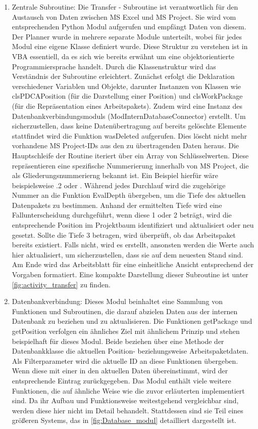 \documentclass[11pt,a4paper]{report}
\begin{document}
\begin{enumerate}
    \item Zentrale Subroutine: Die \glqq Transfer \grqq{}- Subroutine ist verantwortlich für den Austausch von Daten zwischen MS Excel und MS Project. Sie wird vom entsprechenden Python Modul aufgerufen und empfängt Daten von diesem. Der Planner wurde in mehrere separate Module unterteilt, wobei für jedes Modul eine eigene Klasse definiert wurde. Diese Struktur zu verstehen ist in VBA essentiell, da es sich wie bereits erwähnt um eine objektorientierte Programmiersprache handelt. Durch die Klassenstruktur wird das Verständnis der Subroutine erleichtert. Zunächst erfolgt die Deklaration verschiedener Variablen und Objekte, darunter Instanzen von Klassen wie \glqq clsPDCAPosition\grqq{} (für die Darstellung einer Position) und \glqq clsWorkPackage\grqq{} (für die Repräsentation eines Arbeitspakets). Zudem wird eine Instanz des Datenbankverbindungsmoduls (\glqq ModInternDatabaseConnector\grqq{}) erstellt. Um sicherzustellen, dass keine Datenübertragung auf bereits gelöschte Elemente stattfindet wird die Funktion \glqq wasDeleted \grqq{} aufgerufen. Dies löscht nicht mehr vorhandene MS Project-IDs aus den zu übertragenden Daten heraus. Die Hauptschleife der Routine iteriert über ein Array von Schlüsselwerten. Diese repräsentieren eine spezifische Nummerierung innerhalb von MS Project, die als \glqq Gliederungsnummerierng \grqq{} bekannt ist. Ein Beispiel hierfür wäre beispielsweise .2 \grqq{} oder  \grqq{}. Während jedes Durchlauf wird die zugehörige Nummer an die Funktion \glqq EvalDepth \grqq{} übergeben, um die Tiefe des aktuellen Datenpakets zu bestimmen. Anhand der ermittelten Tiefe wird eine Fallunterscheidung durchgeführt, wenn diese 1 oder 2 beträgt, wird die entsprechende Position im Projektbaum identifiziert und aktualisiert oder neu gesetzt. Sollte die Tiefe 3 betragen, wird überprüft, ob das Arbeitspaket bereits existiert. Falls nicht, wird es erstellt, ansonsten werden die Werte auch hier aktualisiert, um sicherzustellen, dass sie auf dem neuesten Stand sind. Am Ende wird das Arbeitsblatt für eine einheitliche Ansicht entsprechend der Vorgaben formatiert. Eine kompakte Darstellung dieser Subroutine ist unter \ref{fig:activity_transfer} zu finden.
    \item Datenbankverbindung: Dieses Modul beinhaltet eine Sammlung von Funktionen und Subroutinen, die darauf abzielen Daten aus der internen Datenbank zu beziehen und zu aktualisieren. Die Funktionen \glqq getPackage \grqq{} und \glqq getPosition \grqq{} verfolgen ein ähnliches Ziel mit ähnlichem Prinzip und stehen beispielhaft für dieses Modul. Beide beziehen über eine Methode der Datenbankklasse die aktuellen Position- beziehungsweise Arbeitspaketdaten. Als Filterparameter wird die aktuelle ID an diese Funktionen übergeben. Wenn diese mit einer in den aktuellen Daten übereinstimmt, wird der entsprechende Eintrag zurückgegeben. Das Modul enthält viele weitere Funktionen, die auf ähnliche Weise wie die zuvor erläuterten implementiert sind. Da ihr Aufbau und Funktionsweise weitestgehend vergleichbar sind, werden diese hier nicht im Detail behandelt. Stattdessen sind sie Teil eines größeren Systems, das in \ref{fig:Database_modul}
    detailliert dargestellt ist.
\end{enumerate}
\end{document}
